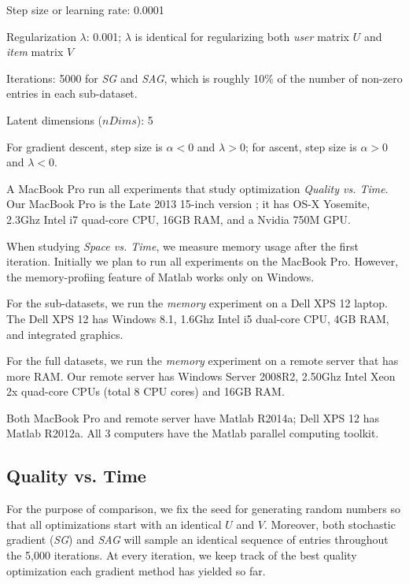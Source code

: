 \begin{sloppy}
\begin{compactitem}
\item Step size or learning rate: 0.0001
\item Regularization $\lambda$: 0.001; $\lambda$ is identical for regularizing both \emph{user} matrix $U$ and \emph{item} matrix $V$
\item Iterations: 5000 for \emph{SG} and \emph{SAG}, which is roughly 10\% of the number of non-zero entries in each sub-dataset.
\item Latent dimensions ($nDims$): 5 
\end{compactitem}
\end{sloppy}

For gradient descent, step size is $\alpha < 0$ and $\lambda > 0$;
for ascent, step size is $\alpha > 0$ and $\lambda < 0$.


A MacBook Pro run all experiments that study optimization \emph{Quality vs. Time}.
Our MacBook Pro is the Late 2013 15-inch version \cite{macbookprolo}; it has OS-X Yosemite, 2.3Ghz Intel i7 quad-core CPU, 16GB RAM, and a Nvidia 750M GPU.

When studying \emph{Space vs. Time}, we measure memory usage after the first iteration.  
Initially we plan to run all experiments on the MacBook Pro.
However, the memory-profiing feature of Matlab works only on Windows.

For the sub-datasets, we run the \emph{memory} experiment on a Dell XPS 12 \cite{dellxps12} laptop.
The Dell XPS 12 has Windows 8.1, 1.6Ghz Intel i5 dual-core CPU, 4GB RAM, and integrated graphics.  

For the full datasets, we run the \emph{memory} experiment on a remote server that has more RAM.
Our remote server has Windows Server 2008R2, 2.50Ghz Intel Xeon 2x quad-core CPUs (total 8 CPU cores) and 16GB RAM.

Both MacBook Pro and remote server have Matlab R2014a; Dell XPS 12 has Matlab R2012a.
All 3 computers have the Matlab parallel computing toolkit.



\subsection{Quality vs. Time}
For the purpose of comparison, we fix the seed for generating random numbers so that all optimizations start with an identical $U$ and $V$.
Moreover, both stochastic gradient (\emph{SG}) and \emph{SAG} will sample an identical sequence of entries throughout the 5,000 iterations.
At every iteration, we keep track of the best quality optimization each gradient method has yielded so far.

